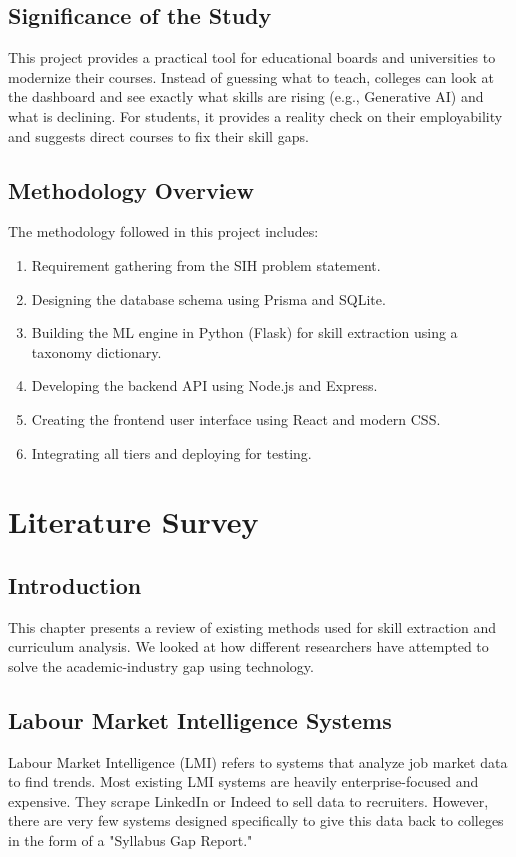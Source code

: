 \documentclass[12pt,a4paper]{report}
\begin{document}
\section{Significance of the Study}
This project provides a practical tool for educational boards and universities to modernize their courses. Instead of guessing what to teach, colleges can look at the dashboard and see exactly what skills are rising (e.g., Generative AI) and what is declining. For students, it provides a reality check on their employability and suggests direct courses to fix their skill gaps.

\section{Methodology Overview}
The methodology followed in this project includes:
\begin{enumerate}
    \item Requirement gathering from the SIH problem statement.
    \item Designing the database schema using Prisma and SQLite.
    \item Building the ML engine in Python (Flask) for skill extraction using a taxonomy dictionary.
    \item Developing the backend API using Node.js and Express.
    \item Creating the frontend user interface using React and modern CSS.
    \item Integrating all tiers and deploying for testing.
\end{enumerate}

\chapter{Literature Survey}

\section{Introduction}
This chapter presents a review of existing methods used for skill extraction and curriculum analysis. We looked at how different researchers have attempted to solve the academic-industry gap using technology.

\section{Labour Market Intelligence Systems}
Labour Market Intelligence (LMI) refers to systems that analyze job market data to find trends. Most existing LMI systems are heavily enterprise-focused and expensive. They scrape LinkedIn or Indeed to sell data to recruiters. However, there are very few systems designed specifically to give this data back to colleges in the form of a "Syllabus Gap Report."
\end{document}
